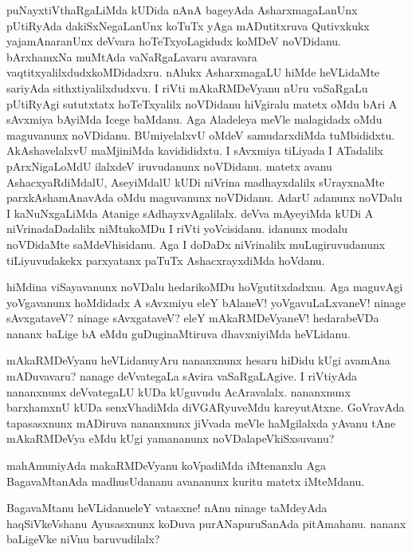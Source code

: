 \begin{mng}
puNayxtiVthaRgaLiMda kUDida nAnA bageyAda AsharxmagaLanUnx pUtiRyAda dakiSxNegaLanUnx koTuTx yAga mADutitxruva Qutivxkukx yajamAnaranUnx deVvara hoTeTxyoLagidudx koMDeV noVDidanu. bArxhamxNa muMtAda vaNaRgaLavaru avaravara vaqtitxyalilxdudxkoMDidadxru. nAlukx AsharxmagaLU hiMde heVLidaMte sariyAda sithxtiyalilxdudxvu. I riVti mAkaRMDeVyanu nUru vaSaRgaLu pUtiRyAgi sututxtatx hoTeTxyalilx noVDidanu hiVgiralu matetx oMdu bAri A sAvxmiya bAyiMda Icege baMdanu. Aga Aladeleya meVle malagidadx oMdu maguvanunx noVDidanu. BUmiyelalxvU oMdeV samudarxdiMda tuMbididxtu. AkAshavelalxvU maMjiniMda kavidididxtu. I sAvxmiya tiLiyada I ATadalilx pArxNigaLoMdU ilalxdeV iruvudanunx noVDidanu. matetx avanu AshacxyaRdiMdalU, AseyiMdalU kUDi niVrina madhayxdalilx sUrayxnaMte parxkAshamAnavAda oMdu maguvanunx noVDidanu. AdarU adanunx noVDalu I kaNuNxgaLiMda Atanige sAdhayxvAgalilalx. deVva mAyeyiMda kUDi A niVrinadaDadalilx niMtukoMDu I riVti yoVcisidanu. idanunx modalu noVDidaMte saMdeVhisidanu. Aga I doDaDx niVrinalilx muLugiruvudanunx tiLiyuvudakekx parxyatanx paTuTx AshacxrayxdiMda hoVdanu.
\end{mng}

\begin{mng}
hiMdina viSayavanunx noVDalu hedarikoMDu hoVgutitxdadxnu. Aga maguvAgi yoVgavanunx hoMdidadx A sAvxmiyu eleY bAlaneV! yoVgavuLaLxvaneV! ninage sAvxgataveV? ninage sAvxgataveV? eleY mAkaRMDeVyaneV! hedarabeVDa nananx baLige bA eMdu guDuginaMtiruva dhavxniyiMda heVLidanu.
\end{mng}

\begin{mng}
mAkaRMDeVyanu heVLidanu\mdash yAru nananxnunx hesaru hiDidu kUgi avamAna mADuvavaru? nanage deVvategaLa sAvira vaSaRgaLAgive. I riVtiyAda nananxnunx deVvategaLU kUDa kUguvudu AcAravalalx. nananxnunx barxhamxnU kUDa senxVhadiMda diVGARyuveMdu kareyutAtxne. GoVravAda tapasasxnunx mADiruva nananxnunx jiVvada meVle haMgilalxda yAvanu tAne mAkaRMDeVya eMdu kUgi yamananunx noVDalapeVkiSxsuvanu?
\end{mng}

\begin{mng}
mahAmuniyAda makaRMDeVyanu koVpadiMda iMtenanxlu Aga BagavaMtanAda madhusUdananu avananunx kuritu matetx iMteMdanu.
\end{mng}

\begin{mng}
BagavaMtanu heVLidanu\mdash eleY vatasxne! nAnu ninage taMdeyAda haqSiVkeVshanu Ayusasxnunx koDuva purANapuruSanAda pitAmahanu. nananx baLigeVke niVnu baruvudilalx?
\end{mng}

